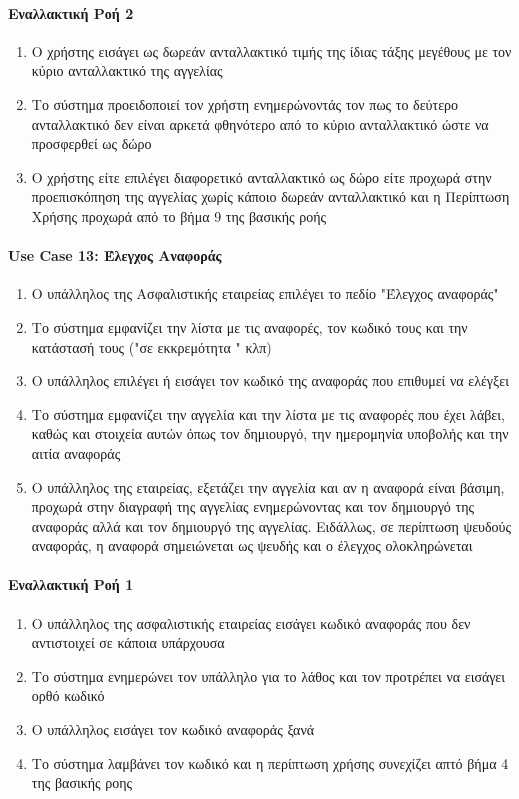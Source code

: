 \documentclass{../ol-softwaremanual}
\begin{document}
	\paragraph{Εναλλακτική Ροή 2}
	
	\begin{enumerate}
		\item Ο χρήστης εισάγει ως δωρεάν ανταλλακτικό τιμής της ίδιας τάξης μεγέθους με τον κύριο ανταλλακτικό της αγγελίας
		\item Το σύστημα προειδοποιεί τον χρήστη ενημερώνοντάς τον πως το δεύτερο ανταλλακτικό δεν είναι αρκετά φθηνότερο από το κύριο ανταλλακτικό ώστε να προσφερθεί ως δώρο
		\item Ο χρήστης είτε επιλέγει διαφορετικό ανταλλακτικό ως δώρο είτε προχωρά στην προεπισκόπηση της αγγελίας χωρίς κάποιο δωρεάν ανταλλακτικό και η Περίπτωση Χρήσης προχωρά από το βήμα 9 της βασικής ροής
	\end{enumerate}
	
	
	\paragraph{\en Use Case 13: \gr Έλεγχος Αναφοράς}  
	\begin{enumerate}
		\item Ο υπάλληλος της Ασφαλιστικής εταιρείας επιλέγει το πεδίο \en"\gr Έλεγχος αναφοράς\en"\gr
		\item Το σύστημα εμφανίζει την λίστα με τις αναφορές, τον κωδικό τους και την κατάστασή τους (\en"\gr σε εκκρεμότητα \en" \gr κλπ)
		\item Ο υπάλληλος επιλέγει ή εισάγει τον κωδικό της αναφοράς που επιθυμεί να ελέγξει 
		\item Το σύστημα εμφανίζει την αγγελία και την λίστα με τις αναφορές που έχει λάβει, καθώς και στοιχεία αυτών όπως τον δημιουργό, την ημερομηνία υποβολής και την αιτία αναφοράς 
		\item Ο υπάλληλος της εταιρείας, εξετάζει την αγγελία και αν η αναφορά είναι βάσιμη, προχωρά στην διαγραφή της αγγελίας ενημερώνοντας και τον δημιουργό της αναφοράς αλλά και τον δημιουργό της αγγελίας. Ειδάλλως, σε περίπτωση ψευδούς αναφοράς, η αναφορά σημειώνεται ως ψευδής και ο έλεγχος ολοκληρώνεται
	\end{enumerate}
	
	\paragraph{Εναλλακτική Ροή 1}
	\begin{enumerate}
		\item Ο υπάλληλος της ασφαλιστικής εταιρείας εισάγει κωδικό αναφοράς που δεν αντιστοιχεί σε κάποια υπάρχουσα
		\item Το σύστημα ενημερώνει τον υπάλληλο  για το λάθος και τον προτρέπει  να εισάγει ορθό κωδικό 
		\item Ο υπάλληλος εισάγει τον κωδικό αναφοράς ξανά
		\item Το σύστημα λαμβάνει τον κωδικό και η περίπτωση χρήσης συνεχίζει απτό βήμα 4 της βασικής ροης
	\end{enumerate}
	
\end{document}
